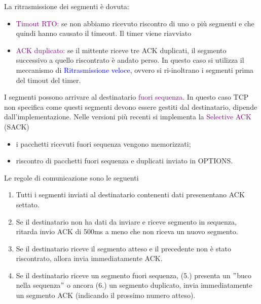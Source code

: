 La ritrasmissione dei segmenti è dovuta:
\begin{itemize}
    \item \textcolor{purple}{Timout RTO:} se non abbiamo ricevuto riscontro di uno o più segmenti e che quindi hanno causato il timeout. 
    Il timer viene riavviato
    \item \textcolor{purple}{ACK duplicato:} se il mittente riceve tre ACK duplicati, il segmento successivo a quello riscontrato è andato perso. 
    In questo caso si utilizza il meccanismo di \textcolor{blue}{Ritrasmissione veloce}, ovvero si ri-inoltrano i segmenti prima del timout del timer.
\end{itemize}

I segmenti possono arrivare al destinatario \textcolor{purple}{fuori sequenza}.
In questo caso TCP non specifica come questi segmenti devono essere gestiti dal destinatario, dipende dall'implementazione.
Nelle versioni più recenti si implementa la \textcolor{purple}{Selective ACK} (SACK)
\begin{itemize}
    \item i pacchetti ricevuti fuori sequenza vengono memorizzati;
    \item riscontro di pacchetti fuori sequenza e duplicati inviato in OPTIONS.
\end{itemize}

Le regole di comunicazione sono le seguenti
\begin{enumerate}
    \item Tutti i segmenti inviati al destinatario contenenti dati presenentano ACK settato.
    \item Se il destinatario non ha dati da inviare e riceve segmento in sequenza, ritarda invio ACK di 500ms a meno che non riceva un nuovo segmento.
    \item Se il destinatario riceve il segmento atteso e il precedente non è stato riscontrato, allora invia immediatamente ACK.
    \item Se il destinatario riceve un segmento fuori sequenza, (5.) presenta un $"$buco nella sequenza$"$ o ancora (6.) un segmento duplicato, invia immediatamente un segmento ACK (indicando il prossimo numero atteso).
\end{enumerate}

